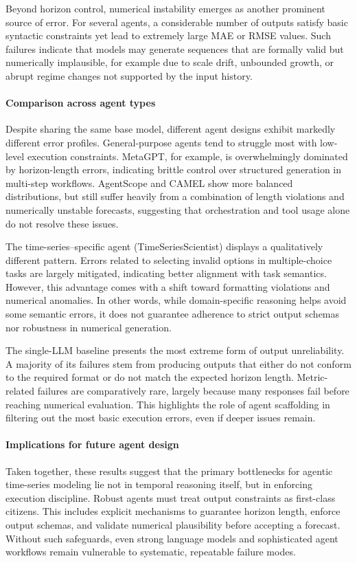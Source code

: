 Beyond horizon control, numerical instability emerges as another prominent source of error. For several agents, a considerable number of outputs satisfy basic syntactic constraints yet lead to extremely large MAE or RMSE values. Such failures indicate that models may generate sequences that are formally valid but numerically implausible, for example due to scale drift, unbounded growth, or abrupt regime changes not supported by the input history.

\paragraph{Comparison across agent types}
Despite sharing the same base model, different agent designs exhibit markedly different error profiles. General-purpose agents tend to struggle most with low-level execution constraints. MetaGPT, for example, is overwhelmingly dominated by horizon-length errors, indicating brittle control over structured generation in multi-step workflows. AgentScope and CAMEL show more balanced distributions, but still suffer heavily from a combination of length violations and numerically unstable forecasts, suggesting that orchestration and tool usage alone do not resolve these issues.

The time-series–specific agent (TimeSeriesScientist) displays a qualitatively different pattern. Errors related to selecting invalid options in multiple-choice tasks are largely mitigated, indicating better alignment with task semantics. However, this advantage comes with a shift toward formatting violations and numerical anomalies. In other words, while domain-specific reasoning helps avoid some semantic errors, it does not guarantee adherence to strict output schemas nor robustness in numerical generation.

The single-LLM baseline presents the most extreme form of output unreliability. A majority of its failures stem from producing outputs that either do not conform to the required format or do not match the expected horizon length. Metric-related failures are comparatively rare, largely because many responses fail before reaching numerical evaluation. This highlights the role of agent scaffolding in filtering out the most basic execution errors, even if deeper issues remain.



\paragraph{Implications for future agent design}
Taken together, these results suggest that the primary bottlenecks for agentic time-series modeling lie not in temporal reasoning itself, but in enforcing execution discipline. Robust agents must treat output constraints as first-class citizens. This includes explicit mechanisms to guarantee horizon length, enforce output schemas, and validate numerical plausibility before accepting a forecast. Without such safeguards, even strong language models and sophisticated agent workflows remain vulnerable to systematic, repeatable failure modes.

